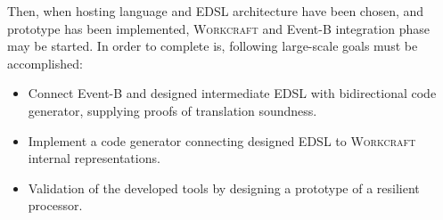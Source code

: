 \documentclass[10pt, a4paper]{article}
\begin{document}
Then, when hosting language and EDSL architecture have been chosen, 
and prototype has been implemented, \textsc{Workcraft} and Event-B integration 
phase may be started. In order to complete is, following large-scale goals
must be accomplished:

\begin{itemize} 
\item Connect Event-B and designed intermediate EDSL with bidirectional code
generator, supplying proofs of translation soundness.
\item Implement a code generator connecting designed EDSL to \textsc{Workcraft}
internal representations.
\item Validation of the developed tools by designing a prototype of a resilient
processor.
\end{itemize}

\printbibliography
\end{document}
